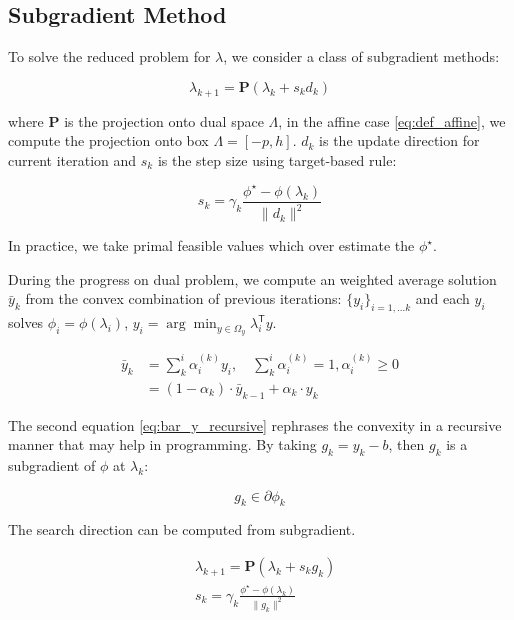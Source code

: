 \documentclass[../main]{subfiles}
\begin{document}
\subsection{Subgradient Method}\label{sec:dual.subgradient}
To solve the reduced problem for $\lambda$, we consider a class of subgradient
methods:

\begin{equation}\label{eq:main_subgrad}
  \lambda_{k+1} = \mathbf{P}(\lambda_{k} + s_{k}d_{k})
\end{equation}

where \(\mathbf P\) is the projection onto dual space \(\Lambda\), in the affine case \eqref{eq:def_affine}, we compute the projection onto box \(\Lambda = [-p, h]\).
\(d_k\) is the update direction for current iteration and \(s_{k}\) is
the step size using target-based rule:

\begin{equation}\label{eq:step_size}
  s_{k} = \gamma_k\frac{\phi^\star - \phi(\lambda_k)}{\|d_{k}\|^2}
\end{equation}

In practice, we take primal feasible values which over estimate the \(\phi^\star\).

During the progress on dual problem,
we compute an weighted average solution \(\bar y_k\) from the convex combination of previous iterations:
\(\{y_i\}_{i=1,...k}\) and each \(y_i\) solves \(\phi_i = \phi(\lambda_i)\), \(y_i = \arg\min_{y\in \Omega_y} \lambda_i^\mathsf{T}y\).

\begin{align}
  \label{eq:bar_y_average} \bar y_k & = \sum^i_k \alpha_i^{(k)} y_i,\quad  \sum^i_k \alpha_i^{(k)} = 1,\alpha_i^{(k)} \ge 0 \\
  \label{eq:bar_y_recursive}        & = (1-\alpha_k)\cdot\bar y_{k-1} + \alpha_k \cdot y_k
\end{align}

The second equation \eqref{eq:bar_y_recursive} rephrases the convexity in a recursive manner that may help in programming.
By taking \(g_k= y_k - b\), then \(g_k\) is a subgradient
of \(\phi\) at \(\lambda_k\):

\begin{equation}g_k \in \partial \phi_k\end{equation}


The search direction can be computed from subgradient.

\begin{equation}\label{eq:simple_subgrad}
  \begin{aligned}
     & \lambda_{k+1} = \mathbf{P}(\lambda_{k} + s_{k}g_{k})             \\
     & s_{k} = \gamma_k\frac{\phi^\star - \phi(\lambda_k)}{\|g_{k}\|^2}
  \end{aligned}
\end{equation}
\end{document}

